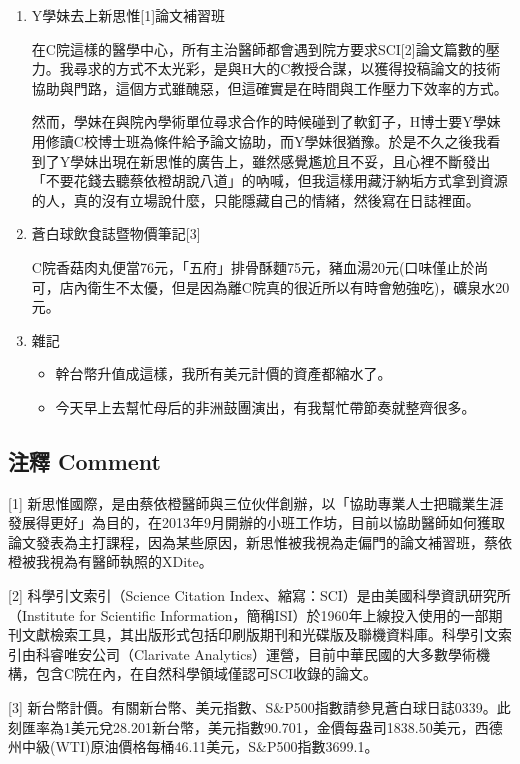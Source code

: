 \documentclass[
]{article}
\providecommand{\tightlist}{%
  \setlength{\itemsep}{0pt}\setlength{\parskip}{0pt}}
\begin{document}
\begin{enumerate}
\def\labelenumi{\arabic{enumi}.}
\item
  Y學妹去上新思惟{[}1{]}論文補習班

  在C院這樣的醫學中心，所有主治醫師都會遇到院方要求SCI{[}2{]}論文篇數的壓力。我尋求的方式不太光彩，是與H大的C教授合謀，以獲得投稿論文的技術協助與門路，這個方式雖醜惡，但這確實是在時間與工作壓力下效率的方式。

  然而，學妹在與院內學術單位尋求合作的時候碰到了軟釘子，H博士要Y學妹用修讀C校博士班為條件給予論文協助，而Y學妹很猶豫。於是不久之後我看到了Y學妹出現在新思惟的廣告上，雖然感覺尷尬且不妥，且心裡不斷發出「不要花錢去聽蔡依橙胡說八道」的吶喊，但我這樣用藏汙納垢方式拿到資源的人，真的沒有立場說什麼，只能隱藏自己的情緒，然後寫在日誌裡面。
\item
  蒼白球飲食誌暨物價筆記{[}3{]}

  C院香菇肉丸便當76元，「五府」排骨酥麵75元，豬血湯20元(口味僅止於尚可，店內衛生不太優，但是因為離C院真的很近所以有時會勉強吃)，礦泉水20元。
\item
  雜記

  \begin{itemize}
  \tightlist
  \item
    幹台幣升值成這樣，我所有美元計價的資產都縮水了。
  \item
    今天早上去幫忙母后的非洲鼓團演出，有我幫忙帶節奏就整齊很多。
  \end{itemize}
\end{enumerate}

\hypertarget{ux6ce8ux91cb-comment-4}{%
\subsection{注釋 Comment}\label{ux6ce8ux91cb-comment-4}}

{[}1{]}
新思惟國際，是由蔡依橙醫師與三位伙伴創辦，以「協助專業人士把職業生涯發展得更好」為目的，在2013年9月開辦的小班工作坊，目前以協助醫師如何獲取論文發表為主打課程，因為某些原因，新思惟被我視為走偏門的論文補習班，蔡依橙被我視為有醫師執照的XDite。

{[}2{]} 科學引文索引（Science Citation
Index、縮寫：SCI）是由美國科學資訊研究所（Institute for Scientific
Information，簡稱ISI）於1960年上線投入使用的一部期刊文獻檢索工具，其出版形式包括印刷版期刊和光碟版及聯機資料庫。科學引文索引由科睿唯安公司（Clarivate
Analytics）運營，目前中華民國的大多數學術機構，包含C院在內，在自然科學領域僅認可SCI收錄的論文。

{[}3{]}
新台幣計價。有關新台幣、美元指數、S\&P500指數請參見蒼白球日誌0339。此刻匯率為1美元兌28.201新台幣，美元指數90.701，金價每盎司1838.50美元，西德州中級(WTI)原油價格每桶46.11美元，S\&P500指數3699.1。
\end{document}
